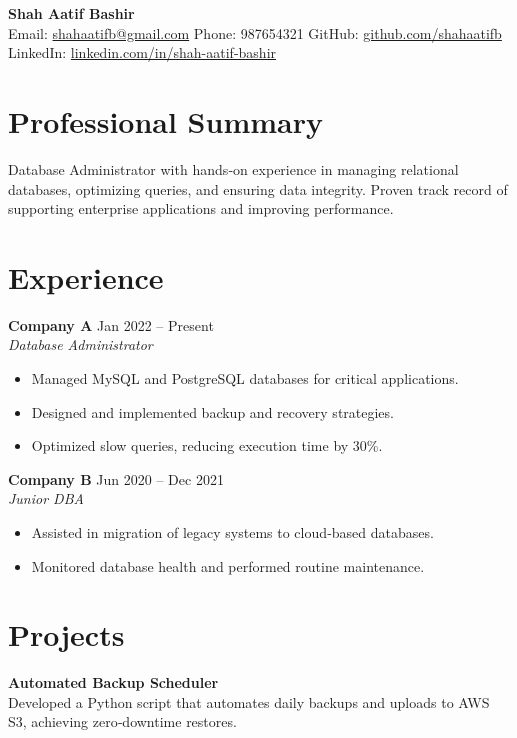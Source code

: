 \documentclass[10pt,a4paper]{article}
\begin{document}
\begin{center}
    {\Large \textbf{Shah Aatif Bashir}}\\
    \vspace{1mm}
    Email: \href{mailto:shahaatifb@gmail.com}{shahaatifb@gmail.com} \quad
    Phone: 987654321 \quad
    GitHub: \href{https://github.com/shahaatifb}{github.com/shahaatifb} \quad
    LinkedIn: \href{https://linkedin.com/in/shah-aatif-bashir}{linkedin.com/in/shah-aatif-bashir}
\end{center}
\section*{Professional Summary}
Database Administrator with hands‑on experience in managing relational databases, optimizing queries, and ensuring data integrity. Proven track record of supporting enterprise applications and improving performance.

\section*{Experience}
\textbf{Company A} \hfill Jan 2022 -- Present\\
\textit{Database Administrator}\\
\begin{itemize}
\item Managed MySQL and PostgreSQL databases for critical applications.
\item Designed and implemented backup and recovery strategies.
\item Optimized slow queries, reducing execution time by 30\%.
\end{itemize}

\textbf{Company B} \hfill Jun 2020 -- Dec 2021\\
\textit{Junior DBA}\\
\begin{itemize}
\item Assisted in migration of legacy systems to cloud‑based databases.
\item Monitored database health and performed routine maintenance.
\end{itemize}

\section*{Projects}
\textbf{Automated Backup Scheduler}\\
Developed a Python script that automates daily backups and uploads to AWS S3, achieving zero‑downtime restores.
\end{document}
